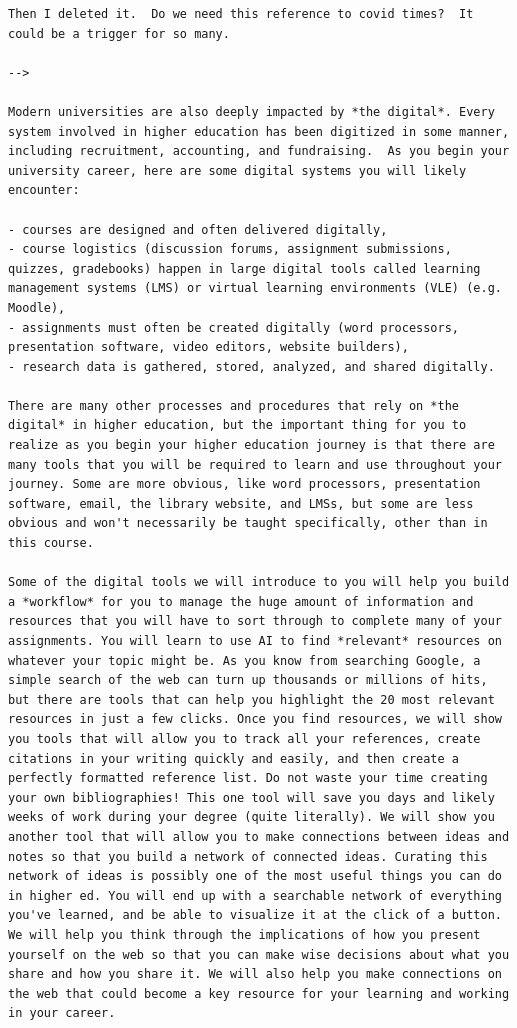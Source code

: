 \documentclass[
]{book}
\theoremstyle{definition}
\theoremstyle{definition}
\theoremstyle{definition}
\theoremstyle{definition}
\theoremstyle{remark}
\begin{document}
\begin{verbatim}
Then I deleted it.  Do we need this reference to covid times?  It could be a trigger for so many.

-->

Modern universities are also deeply impacted by *the digital*. Every system involved in higher education has been digitized in some manner, including recruitment, accounting, and fundraising.  As you begin your university career, here are some digital systems you will likely encounter: 

- courses are designed and often delivered digitally, 
- course logistics (discussion forums, assignment submissions, quizzes, gradebooks) happen in large digital tools called learning management systems (LMS) or virtual learning environments (VLE) (e.g. Moodle), 
- assignments must often be created digitally (word processors, presentation software, video editors, website builders),
- research data is gathered, stored, analyzed, and shared digitally.

There are many other processes and procedures that rely on *the digital* in higher education, but the important thing for you to realize as you begin your higher education journey is that there are many tools that you will be required to learn and use throughout your journey. Some are more obvious, like word processors, presentation software, email, the library website, and LMSs, but some are less obvious and won't necessarily be taught specifically, other than in this course.

Some of the digital tools we will introduce to you will help you build a *workflow* for you to manage the huge amount of information and resources that you will have to sort through to complete many of your assignments. You will learn to use AI to find *relevant* resources on whatever your topic might be. As you know from searching Google, a simple search of the web can turn up thousands or millions of hits, but there are tools that can help you highlight the 20 most relevant resources in just a few clicks. Once you find resources, we will show you tools that will allow you to track all your references, create citations in your writing quickly and easily, and then create a perfectly formatted reference list. Do not waste your time creating your own bibliographies! This one tool will save you days and likely weeks of work during your degree (quite literally). We will show you another tool that will allow you to make connections between ideas and notes so that you build a network of connected ideas. Curating this network of ideas is possibly one of the most useful things you can do in higher ed. You will end up with a searchable network of everything you've learned, and be able to visualize it at the click of a button. We will help you think through the implications of how you present yourself on the web so that you can make wise decisions about what you share and how you share it. We will also help you make connections on the web that could become a key resource for your learning and working in your career.



\end{verbatim}
\end{document}
